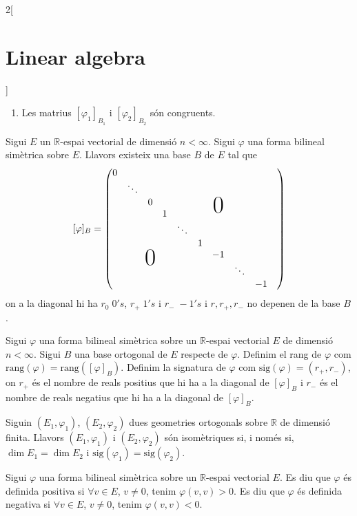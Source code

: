 \documentclass[class=article,10pt,crop=false]{standalone}
\begin{document}
\begin{multicols}{2}[\section{Linear algebra}]
\begin{prop}
\begin{enumerate}
    \item Les matrius $[\varphi_1]_{B_1}$ i $[\varphi_2]_{B_2}$ són congruents.
\end{enumerate}
\end{prop}
\begin{theorem}
Sigui $E$ un $\mathbb{R}$-espai vectorial de dimensió $n<\infty$. Sigui $\varphi$ una forma bilineal simètrica sobre $E$. Llavors existeix una base $B$ de $E$ tal que $$[\varphi]_B=\begin{pmatrix}
0 &&&&&&&&&\\
& \ddots&&&&&&&\\
&& 0&&&&\bigzero&&\\
&&& 1 &&&&&\\
&&&& \ddots &&&&\\
&&&&& 1 &&&\\
&&\bigzero&&&& -1 &&\\
&&&&&&&\ddots &\\
&&&&&&&& -1
\end{pmatrix}$$
on a la diagonal hi ha $r_0\;0's$, $r_+\;1's$ i $r_-\;-1's$ i $r,r_+,r_-$ no depenen de la base $B$.
\end{theorem}
\begin{definition}
Sigui $\varphi$ una forma bilineal simètrica sobre un $\mathbb{R}$-espai vectorial $E$ de dimensió $n<\infty$. Sigui $B$ una base ortogonal de $E$ respecte de $\varphi$. Definim el rang de $\varphi$ com $\text{rang}(\varphi)=\text{rang}([\varphi]_B)$. Definim la signatura de $\varphi$ com $\text{sig}(\varphi)=(r_+,r_-)$, on $r_+$ és el nombre de reals positius que hi ha a la diagonal de $[\varphi]_B$ i $r_-$ és el nombre de reals negatius que hi ha a la diagonal de $[\varphi]_B$.
\end{definition}
\begin{theorem}
Siguin $(E_1,\varphi_1)$, $(E_2,\varphi_2)$ dues geometries ortogonals sobre $\mathbb{R}$ de dimensió finita. Llavors $(E_1,\varphi_1)$ i $(E_2,\varphi_2)$ són isomètriques si, i només si, $\dim E_1=\dim E_2$ i $\text{sig}(\varphi_1)=\text{sig}(\varphi_2)$.
\end{theorem}
\begin{definition}
Sigui $\varphi$ una forma bilineal simètrica sobre un $\mathbb{R}$-espai vectorial $E$. Es diu que $\varphi$ és definida positiva si $\forall v\in E$, $v\ne 0$, tenim $\varphi(v,v)>0$. Es diu que $\varphi$ és definida negativa si $\forall v\in E$, $v\ne 0$, tenim $\varphi(v,v)<0$. 
\end{definition}

\end{multicols}
\end{document}
